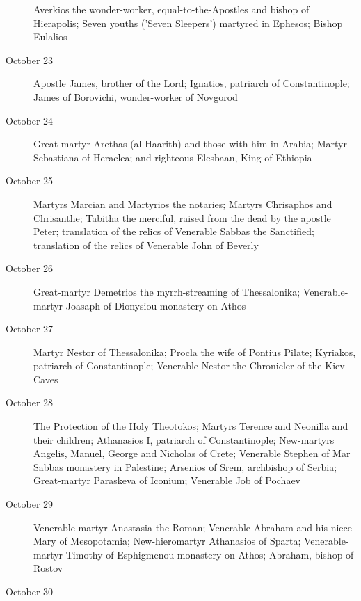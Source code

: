 \begin{description}
Averkios the wonder-worker, equal-to-the-Apostles and bishop of Hierapolis; Seven youths ('Seven Sleepers') martyred in Ephesos; Bishop Eulalios

\item[October 23]

Apostle James, brother of the Lord; Ignatios, patriarch of Constantinople; James of Borovichi, wonder-worker of Novgorod

\item[October 24]

Great-martyr Arethas (al-Haarith) and those with him in Arabia; Martyr Sebastiana of Heraclea; and righteous Elesbaan, King of Ethiopia

\item[October 25]

Martyrs Marcian and Martyrios the notaries; Martyrs Chrisaphos and Chrisanthe; Tabitha the merciful, raised from the dead by the apostle Peter; translation of the relics of Venerable Sabbas the Sanctified; translation of the relics of Venerable John of Beverly

\item[October 26]

Great-martyr Demetrios the myrrh-streaming of Thessalonika; Venerable-martyr Joasaph of Dionysiou monastery on Athos

\item[October 27]

Martyr Nestor of Thessalonika; Procla the wife of Pontius Pilate; Kyriakos, patriarch of Constantinople; Venerable Nestor the Chronicler of the Kiev Caves

\item[October 28]

The Protection of the Holy Theotokos; Martyrs Terence and Neonilla and their children; Athanasios I, patriarch of Constantinople; New-martyrs Angelis, Manuel, George and Nicholas of Crete; Venerable Stephen of Mar Sabbas monastery in Palestine; Arsenios of Srem, archbishop of Serbia; Great-martyr Paraskeva of Iconium; Venerable Job of Pochaev

\item[October 29]

Venerable-martyr Anastasia the Roman; Venerable Abraham and his niece Mary of Mesopotamia; New-hieromartyr Athanasios of Sparta; Venerable-martyr Timothy of Esphigmenou monastery on Athos; Abraham, bishop of Rostov

\item[October 30]


\end{description}
